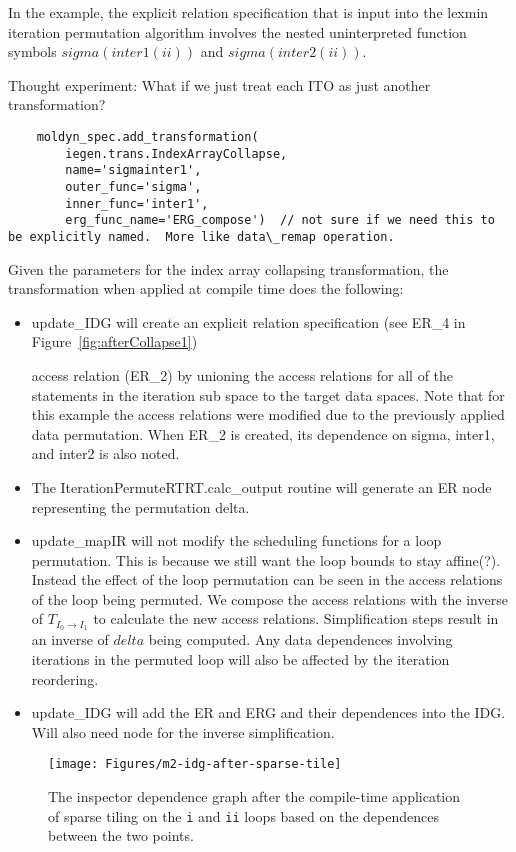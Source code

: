 \documentclass{article}
\begin{document}
In the example, the explicit relation specification that is input into the lexmin iteration permutation algorithm involves the nested uninterpreted function symbols $sigma(inter1(ii))$ and $sigma(inter2(ii))$.

Thought experiment:  What if we just treat each ITO as just another transformation?
\begin{verbatim}
    moldyn_spec.add_transformation(
        iegen.trans.IndexArrayCollapse,
        name='sigmainter1',
        outer_func='sigma',
        inner_func='inter1',
        erg_func_name='ERG_compose')  // not sure if we need this to be explicitly named.  More like data\_remap operation.
\end{verbatim}


Given the parameters for the index array collapsing transformation, 
the transformation when applied at compile time does the following:
	\begin{itemize}	
	\item update\_IDG will create an explicit relation specification (see ER\_4 in Figure~\ref{fig:afterCollapse1})
	
	access relation (ER\_2) by unioning the access relations for all of the statements in the iteration sub space to the target data spaces.  Note  that for this example the access relations were modified due to the previously applied data permutation.  When ER\_2 is created, its dependence on sigma, inter1, and inter2 is also noted.
\item The IterationPermuteRTRT.calc\_output routine will generate an ER node representing the permutation delta.
\item update\_mapIR will not modify the scheduling functions for a loop permutation.  This is because we still want the loop bounds to stay affine(?).  Instead the effect of the loop permutation can be seen in the access relations of the loop being permuted.  We compose the access relations with the inverse of $T_{I_0 \rightarrow I_1}$ to calculate the new access relations.  Simplification steps result in an inverse of $delta$ being computed.
Any data dependences involving iterations in the permuted loop will also be affected by the iteration reordering. 
\item update\_IDG will add the ER and ERG and their dependences into the IDG.  Will also need node for the inverse simplification.
	\end{itemize}


\begin{figure}[h!]
\texttt{[image: Figures/m2-idg-after-sparse-tile]}
\caption{The inspector dependence graph after the compile-time application of sparse tiling on the
{\tt i} and {\tt ii} loops based on the dependences between the two points.}
\label{fig:afterST}
\end{figure}
\end{document}
